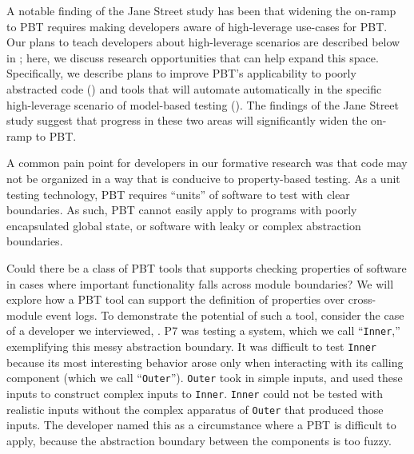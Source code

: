 %
%
A notable finding of the Jane Street study has been that widening the
on-ramp to PBT requires making developers aware of high-leverage
use-cases for PBT. Our plans to teach developers about high-leverage
scenarios are described below in ; here,
we discuss research opportunities that can help expand this space.
Specifically, we describe plans to improve PBT's applicability to
poorly abstracted code () and
tools that will automate automatically in the specific high-leverage
scenario of model-based testing ().
The findings of the Jane Street study suggest that progress in these
two areas will significantly widen the on-ramp to PBT.

A common pain point for developers in our formative research
was that code may not be organized in a way that is conducive to property-based
testing. As a unit testing technology, PBT requires ``units'' of software to
test with clear boundaries. As such, PBT cannot easily apply to programs with
poorly encapsulated global state, or software with leaky or complex abstraction
boundaries.

Could there be a class of PBT tools that supports checking properties of
software in cases where important functionality falls across module boundaries?
We will explore how a PBT tool can support the definition of properties over
cross-module event logs. To demonstrate the potential of such a tool, consider
the case of a developer we interviewed, . P7 was testing
a system, which we call ``\lstinline{Inner},'' exemplifying this messy
abstraction
boundary. It was difficult to test \lstinline{Inner} because
its most interesting behavior arose only when interacting with its calling
component (which we call ``\lstinline{Outer}'').
\lstinline{Outer} took in simple inputs, and used these inputs to construct
complex inputs to \lstinline{Inner}. \lstinline{Inner} could not be tested with
realistic inputs without the complex apparatus of \lstinline{Outer} that
produced those inputs. The developer named this as a circumstance where a
PBT is difficult to apply, because the abstraction boundary between the
components is too fuzzy.

